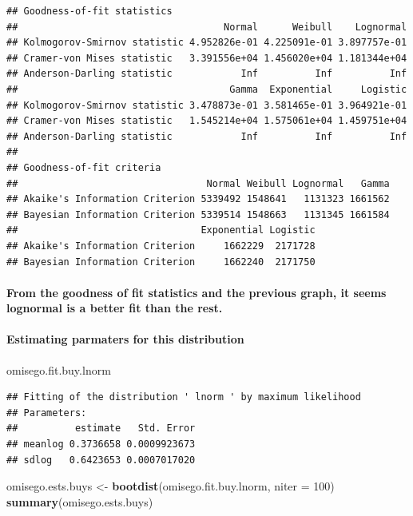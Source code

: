 \documentclass[]{article}
\newenvironment{Shaded}{\begin{snugshade}}{\end{snugshade}}
\newcommand{\KeywordTok}[1]{\textcolor[rgb]{0.13,0.29,0.53}{\textbf{#1}}}
\newcommand{\DataTypeTok}[1]{\textcolor[rgb]{0.13,0.29,0.53}{#1}}
\newcommand{\DecValTok}[1]{\textcolor[rgb]{0.00,0.00,0.81}{#1}}
\newcommand{\StringTok}[1]{\textcolor[rgb]{0.31,0.60,0.02}{#1}}
\newcommand{\NormalTok}[1]{#1}
\let\oldparagraph\paragraph
\renewcommand{\paragraph}[1]{\oldparagraph{#1}\mbox{}}
\begin{document}
\begin{verbatim}
## Goodness-of-fit statistics
##                                    Normal      Weibull    Lognormal
## Kolmogorov-Smirnov statistic 4.952826e-01 4.225091e-01 3.897757e-01
## Cramer-von Mises statistic   3.391556e+04 1.456020e+04 1.181344e+04
## Anderson-Darling statistic            Inf          Inf          Inf
##                                     Gamma  Exponential     Logistic
## Kolmogorov-Smirnov statistic 3.478873e-01 3.581465e-01 3.964921e-01
## Cramer-von Mises statistic   1.545214e+04 1.575061e+04 1.459751e+04
## Anderson-Darling statistic            Inf          Inf          Inf
## 
## Goodness-of-fit criteria
##                                 Normal Weibull Lognormal   Gamma
## Akaike's Information Criterion 5339492 1548641   1131323 1661562
## Bayesian Information Criterion 5339514 1548663   1131345 1661584
##                                Exponential Logistic
## Akaike's Information Criterion     1662229  2171728
## Bayesian Information Criterion     1662240  2171750
\end{verbatim}

\paragraph{From the goodness of fit statistics and the previous graph,
it seems lognormal is a better fit than the
rest.}\label{from-the-goodness-of-fit-statistics-and-the-previous-graph-it-seems-lognormal-is-a-better-fit-than-the-rest.-2}

\paragraph{Estimating parmaters for this
distribution}\label{estimating-parmaters-for-this-distribution-4}

\begin{Shaded}
\begin{Highlighting}[]
\NormalTok{omisego.fit.buy.lnorm}
\end{Highlighting}
\end{Shaded}

\begin{verbatim}
## Fitting of the distribution ' lnorm ' by maximum likelihood 
## Parameters:
##          estimate   Std. Error
## meanlog 0.3736658 0.0009923673
## sdlog   0.6423653 0.0007017020
\end{verbatim}

\begin{Shaded}
\begin{Highlighting}[]
\NormalTok{omisego.ests.buys <-}\StringTok{ }\KeywordTok{bootdist}\NormalTok{(omisego.fit.buy.lnorm, }\DataTypeTok{niter =} \DecValTok{100}\NormalTok{)}
\KeywordTok{summary}\NormalTok{(omisego.ests.buys)}
\end{Highlighting}
\end{Shaded}
\end{document}
